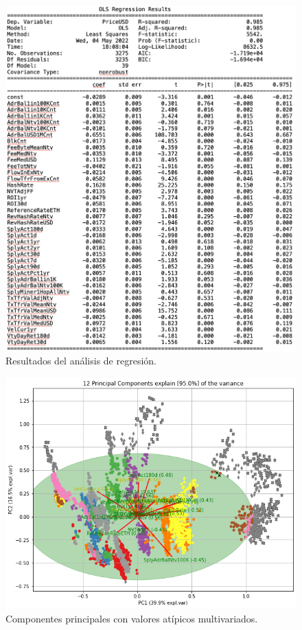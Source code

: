 \begin{figure}
	\centering
	\includegraphics[scale=0.7]{Chapter5/OLS.png}
	\caption{Resultados del análisis de regresión.}
	\label{fig10}
\end{figure}

\begin{figure}
	\centering
	\includegraphics[scale=0.6]{Chapter5/pca_val_atipi.png}
	\caption{Componentes principales con valores atípicos multivariados.}
	\label{fig12}
\end{figure}

